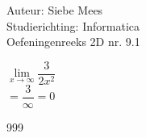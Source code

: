 \documentclass[a4paper]{article}
\begin{document}
  
\noindent \large Auteur: Siebe Mees \\
\noindent \large Studierichting: Informatica\\
\noindent \large Oefeningenreeks 2D nr. 9.1\\

\medskip

\normalsize

$\lim\limits_{x \rightarrow \infty} \dfrac{3}{2x^2} $\\ 

$ = \dfrac{3}{\infty} = 0 $\\

\begin{thebibliography}{999}
\end{thebibliography}
\end{document}
